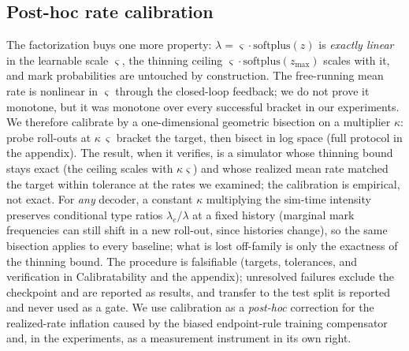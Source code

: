 \subsection{Post-hoc rate calibration}
\label{sec:calibration}
The factorization buys one more property: $\lambda = \varsigma\cdot\mathrm{softplus}(z)$ is
\emph{exactly linear} in the learnable scale $\varsigma$, the thinning ceiling
$\varsigma\cdot\mathrm{softplus}(z_{\max})$ scales with it, and mark
probabilities are untouched by construction. The free-running mean rate is
nonlinear in $\varsigma$ through the closed-loop feedback; we do not prove
it monotone, but it was monotone over every successful bracket in our
experiments. We therefore calibrate by a one-dimensional geometric bisection
on a multiplier $\kappa$: probe roll-outs at $\kappa\,\varsigma$ bracket the
target, then bisect in log space (full protocol in the appendix). The
result, when it verifies, is a simulator whose thinning bound stays exact
(the ceiling scales with $\kappa\varsigma$) and whose realized mean rate
matched the target within tolerance at the rates we examined; the
calibration is empirical, not exact. For \emph{any} decoder, a constant
$\kappa$ multiplying the sim-time intensity preserves conditional type
ratios $\lambda_e/\lambda$ at a fixed history (marginal mark frequencies can
still shift in a new roll-out, since histories change), so the same
bisection applies to every baseline; what is lost off-family is only the
exactness of the thinning bound. The procedure is falsifiable (targets,
tolerances, and verification in Calibratability and the appendix);
unresolved failures exclude the checkpoint and are reported as results, and
transfer to the test split is reported and never used as a gate. We use calibration as
a \emph{post-hoc} correction for the realized-rate inflation caused by the
biased endpoint-rule training compensator and, in the experiments, as a
measurement instrument in its own right.
